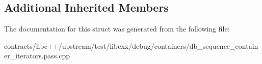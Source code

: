 \subsection*{Additional Inherited Members}


The documentation for this struct was generated from the following file\+:\begin{DoxyCompactItemize}
\item 
contracts/libc++/upstream/test/libcxx/debug/containers/db\+\_\+sequence\+\_\+container\+\_\+iterators.\+pass.\+cpp\end{DoxyCompactItemize}
